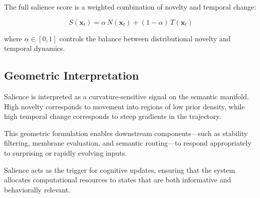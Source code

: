 The full salience score is a weighted combination of novelty and temporal
change:

\[
S(\mathbf{x}_t) =
\alpha\, N(\mathbf{x}_t) + (1 - \alpha)\, T(\mathbf{x}_t)
\]

where $\alpha \in [0,1]$ controls the balance between distributional novelty
and temporal dynamics.

\subsection{Geometric Interpretation}

Salience is interpreted as a curvature-sensitive signal on the semantic
manifold. High novelty corresponds to movement into regions of low prior
density, while high temporal change corresponds to steep gradients in the
trajectory.

This geometric formulation enables downstream components—such as stability
filtering, membrane evaluation, and semantic routing—to respond appropriately
to surprising or rapidly evolving inputs.

Salience acts as the trigger for cognitive updates, ensuring that the system
allocates computational resources to states that are both informative and
behaviorally relevant.
